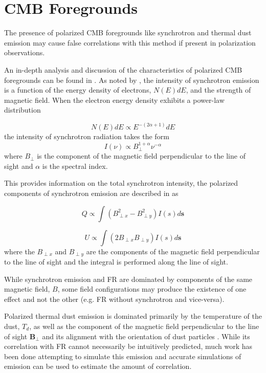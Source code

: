 \documentclass[usenatbib,hidelinks]{mnras}
\begin{document}
\section{CMB Foregrounds}\label{sec:foregrounds}{

 The presence of polarized CMB foregrounds like synchrotron and thermal dust emission may cause false correlations with this method if present in polarization observations.
 
  An in-depth analysis and discussion of the characteristics of polarized CMB foregrounds can be found in \citet{planck:2016diffuse}. As noted by \citet{dineen:2004}, the intensity of synchrotron emission is a function of the energy density of electrons, $N(E)dE$, and the strength of magnetic field. When the electron energy density exhibits a power-law distribution

\begin{equation}
N(E)dE \propto E^{-(2\alpha +1)}dE
\end{equation}
the intensity of synchrotron radiation takes the form
\begin{equation}
I(\nu) \propto B_{\perp}^{1+\alpha}\nu^{-\alpha}
\end{equation}
where $B_{\perp}$ is the component of the magnetic field perpendicular to the line of sight  and $\alpha$ is the spectral index.

This provides information on the total synchrotron intensity, the 
polarized components of synchrotron emission are described in \citet{orlando_strong2013} as

\begin{equation}
Q \propto \int(B_{\perp x}^{2} - B_{\perp y}^{2}) I(s)d\mathbf{s}
\end{equation}

\begin{equation}
U \propto \int(2B_{\perp x}B_{\perp y}) I(s)d\mathbf{s}
\end{equation}
where the $B_{\perp x}$ and $B_{\perp y}$ are the components of the 
magnetic field perpendicular to the line of sight and the integral
is performed along the line of sight.


While synchrotron emission and FR are dominated by components of the 
same magnetic field, $B$, some field configurations may produce
the existence of one effect and not the other (e.g. FR without synchrotron and vice-versa). 

Polarized thermal dust emission is dominated primarily by the temperature of the dust, $T_{d}$, as well as the 
component of the magnetic field perpendicular to the line of 
sight $\mathbf{B_{\perp}}$ and its alignment with the orientation
of dust particles \citep{planck:2015xx}. 
While its correlation with FR cannot necessarily be intuitively
predicted, much work has been done attempting to simulate this
emission \citep{planck:2015xx,ghosh:2017,vansyngel:2017} and 
accurate simulations of emission can be used to estimate the 
amount of correlation.


}
\end{document}
